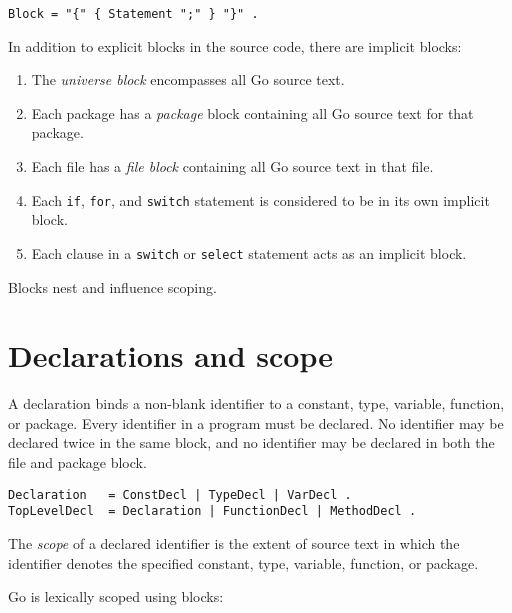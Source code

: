 \begin{Verbatim}[frame=single]
Block = "{" { Statement ";" } "}" .
\end{Verbatim}

In addition to explicit blocks in the source code, there are implicit
blocks:

\begin{enumerate}
\item
  The \emph{universe block} encompasses all Go source text.
\item
  Each package has a \emph{package} block
  containing all Go source text for that package.
\item
  Each file has a \emph{file block} containing all Go source text in
  that file.
\item
  Each \texttt{if}, \texttt{for}, and \texttt{switch} statement is
  considered to be in its own implicit block.
\item
  Each clause in a \texttt{switch} or \texttt{select} statement acts as
  an implicit block.
\end{enumerate}

Blocks nest and influence scoping.

\section*{Declarations and scope}

A declaration binds a non-blank identifier
to a constant, type, variable, function, or package. Every identifier in
a program must be declared. No identifier may be declared twice in the
same block, and no identifier may be declared in both the file and
package block.

\begin{Verbatim}[frame=single]
Declaration   = ConstDecl | TypeDecl | VarDecl .
TopLevelDecl  = Declaration | FunctionDecl | MethodDecl .
\end{Verbatim}

The \emph{scope} of a declared identifier is the extent of source text
in which the identifier denotes the specified constant, type, variable,
function, or package.

Go is lexically scoped using blocks:

